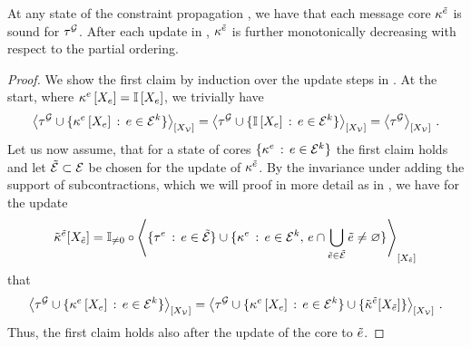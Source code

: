 \begin{theorem}
    \label{the:soundnessKnowledgePropagation}
    At any state of the constraint propagation , we have that each message core $\kappa^{\tilde{e}}$ is sound for $\tau^{\mathcal{G}}$.
    After each update in , $\kappa^{\tilde{e}}$ is further monotonically decreasing with respect to the partial ordering.
\end{theorem}
\begin{proof}
    We show the first claim by induction over the update steps in .
    At the start, where $\kappa^{e}\left[X_{e}\right] = \mathbb{I}\left[X_{e}\right]$, we trivially have
    \begin{align*}
        \left\langle \tau^{\mathcal{G}} \cup \{\kappa^{e}\left[X_{e}\right] \,:\, e\in\mathcal{E}^{k}\}\right\rangle_{\left[ X_{\mathcal{V}} \right]}
        = \left\langle \tau^{\mathcal{G}} \cup \{\mathbb{I}\left[X_{e}\right] \,:\, e\in\mathcal{E}^{k}\}\right\rangle_{\left[ X_{\mathcal{V}} \right]}
        = \left\langle \tau^{\mathcal{G}}\right\rangle_{\left[ X_{\mathcal{V}} \right]} \, .
    \end{align*}
    Let us now assume, that for a state of cores $\{\kappa^{e} \,:\, e\in\mathcal{E}^{k}\}$ the first claim holds and let $\tilde{\mathcal{E}}\subset\mathcal{E}$ be chosen for the update of $\kappa^{\tilde{e}}$.
    By the invariance under adding the support of subcontractions, which we will proof in more detail as  in , we have for the update
    \begin{align*}
        \tilde{\kappa}^{\tilde{e}}[X_{\tilde{e}}]
        = \mathbb{I}_{\neq0}\circ\left\langle 
            \{\tau^{e} \,:\, e\in\tilde{\mathcal{E}}\} \cup \{\kappa^{e} \,:\, e\in\mathcal{E}^{k}, \, e\cap\bigcup_{\tilde{e}\in\tilde{\mathcal{E}}}\tilde{e}\neq\varnothing  \}
        \right\rangle_{\left[ X_{\tilde{e}} \right]}
    \end{align*}
    that
    \begin{align*}
        \left\langle \tau^{\mathcal{G}} \cup \{\kappa^{e}\left[X_{e}\right] \,:\, e\in\mathcal{E}^{k}\}\right\rangle_{\left[ X_{\mathcal{V}} \right]}
        = \left\langle \tau^{\mathcal{G}} \cup \{\kappa^{e}\left[X_{e}\right] \,:\, e\in\mathcal{E}^{k}\} \cup \{\tilde{\kappa}^{\tilde{e}}[X_{\tilde{e}}]\}
        \right\rangle_{\left[ X_{\mathcal{V}} \right]}  \, .
    \end{align*}
    Thus, the first claim holds also after the update of the core to $\tilde{e}$.


\end{proof}
